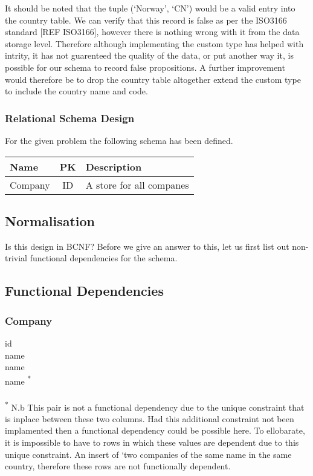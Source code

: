\documentclass[12pt]{article}
\begin{document}
It should be noted that the tuple (`Norway', `CN') would be a valid entry into the country table. We can verify that this record is false as per the ISO3166 standard [REF ISO3166], however there is nothing wrong with it from the data storage level. Therefore although implementing the custom type has helped with intrity, it has not guarenteed the quality of the data, or put another way it, is possible for our schema to record false propositions. A further improvement would therefore be to drop the country table altogether extend the custom type to include the country name and code.

\subsubsection{Relational Schema Design}
For the given problem the following schema has been defined.

\begin{tabular}{l|c|l}
Name&PK&Description\\\hline
Company&ID&A store for all companes\\
\end{tabular}

\subsection{Normalisation}
Is this design in BCNF? Before we give an answer to this, let us first list out non-trivial functional dependencies for the schema.

\subsection{Functional Dependencies}
\subsubsection{Company}

id  \\
name  \\
name  \\
name \not {} \textsuperscript{*} \\

\\ \textsuperscript{*} N.b This pair is not a functional dependency due to the unique constraint that is inplace between these two columns. Had this additional constraint not been implamented then a functional dependency could be possible here. To ellobarate, it is impossible to have to rows in which these values are dependent due to this unique constraint. An insert of `two companies of the same name in the same country, therefore these rows are not functionally dependent.
\end{document}
